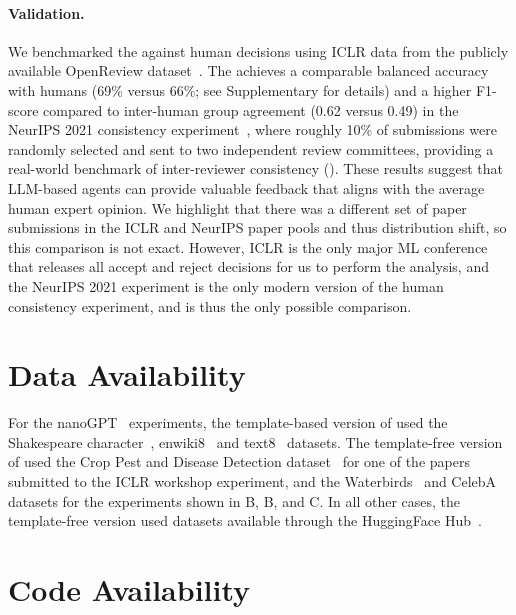 \paragraph{Validation.}

We benchmarked the \ourreviewer against human decisions using ICLR data from the publicly available OpenReview dataset~\citep{gonzalez2024learning}.
The \ourreviewer achieves a comparable balanced accuracy with humans (69\% versus 66\%; see Supplementary  for details) and a higher F1-score compared to inter-human group agreement (0.62 versus 0.49) in the NeurIPS 2021 consistency experiment~\citep{beygelzimer2021neurips}, where roughly 10\% of submissions were randomly selected and sent to two independent review committees, providing a real-world benchmark of inter-reviewer consistency ().
These results suggest that LLM-based agents can provide valuable feedback that aligns with the average human expert opinion.
We highlight that there was a different set of paper submissions in the ICLR and NeurIPS paper pools and thus distribution shift, so this comparison is not exact.
However, ICLR is the only major ML conference that releases all accept and reject decisions for us to perform the analysis, and the NeurIPS 2021 experiment is the only modern version of the human consistency experiment, and is thus the only possible comparison.

\newpage
\section*{Data Availability}

For the nanoGPT~\citep{karpathy2022nanogpt} experiments, the template-based version of \ouralgo used the Shakespeare character~\citep{char_shakespeare}, enwiki8~\citep{hutter_prize} and text8~\citep{text8} datasets.
The template-free version of \ouralgo used the Crop Pest and Disease Detection dataset~\citep{mensah2023crop} for one of the papers submitted to the ICLR workshop experiment, and the Waterbirds~\citep{waterbirds_dataset} and CelebA~\citep{liu2015faceattributes} datasets for the experiments shown in B, B, and C.
In all other cases, the template-free version used datasets available through the HuggingFace Hub~\citep{wolf2020huggingface}.


\section*{Code Availability}
\label{sec:code_availability}

